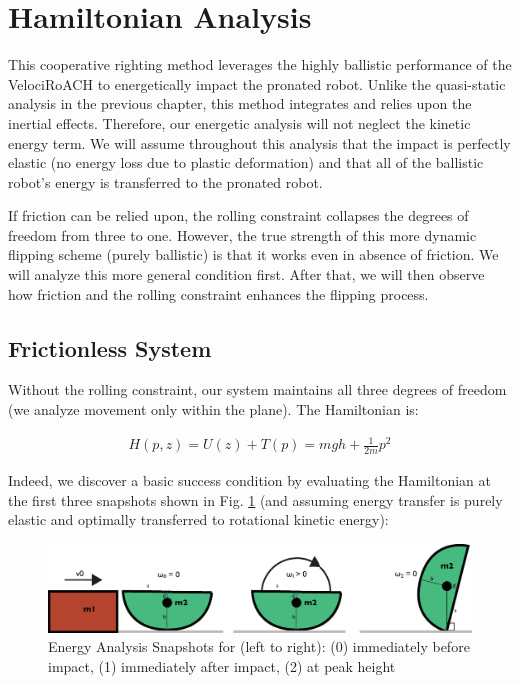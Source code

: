 \documentclass[letterpaper]{report}
\begin{document}
\section{Hamiltonian Analysis}
This cooperative righting method leverages the highly ballistic performance of the VelociRoACH to energetically impact the pronated robot.
Unlike the quasi-static analysis in the previous chapter, this method integrates and relies upon the inertial effects.
Therefore, our energetic analysis will not neglect the kinetic energy term.
We will assume throughout this analysis that the impact is perfectly elastic (no energy loss due to plastic deformation) and that all of the ballistic robot's energy is transferred to the pronated robot.


If friction can be relied upon, the rolling constraint collapses the degrees of freedom from three to one.
However, the true strength of this more dynamic flipping scheme (purely ballistic) is that it works even in absence of friction.
We will analyze this more general condition first. After that, we will then observe how friction and the rolling constraint enhances the flipping process.

\subsection{Frictionless System} %
Without the rolling constraint, our system maintains all three degrees of freedom (we analyze movement only within the plane).
The Hamiltonian is:

\begin{align}
  H(p,z) = U(z) + T(p) = m g h + \frac{1}{2 m} p^2
\end{align}

Indeed, we discover a basic success condition by evaluating the Hamiltonian at the first three snapshots shown in Fig. \ref{fig:DynFrames} (and assuming energy transfer is purely elastic and optimally transferred to rotational kinetic energy):

\begin{figure}
  \centering
  \includegraphics[width=\textwidth]{Dyn_EnergyFrames.eps}
  \caption{\label{fig:DynFrames}Energy Analysis Snapshots for (left to right): (0) immediately before impact, (1) immediately after impact, (2) at peak height}
\end{figure}
\end{document}

